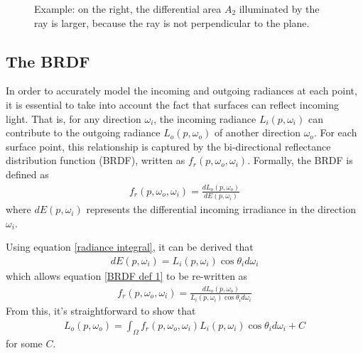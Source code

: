 \begin{figure}[H]
    

\caption{Example: on the right, the differential area $A_2$ illuminated by the ray is larger, because the ray is not perpendicular to the plane.}    
\end{figure}


\subsection{The BRDF}

In order to accurately model the incoming and outgoing radiances at each point, it is essential to take into account the fact that surfaces can reflect incoming light. That is, for any direction $\omega_i$, the incoming radiance $L_i(p,\omega_i)$ can contribute to the outgoing radiance $L_o(p,\omega_o)$ of another direction $\omega_o$. For each surface point, this relationship is captured by the bi-directional reflectance distribution function (BRDF), written as $f_r(p,\omega_o,\omega_i)$. Formally, the BRDF is defined as 
\begin{align}
    f_r(p,\omega_o,\omega_i) = \frac{dL_o(p,\omega_o)}{dE(p,\omega_i)}
    \label{BRDF def 1}
\end{align}
where $dE(p,\omega_i)$ represents the differential incoming irradiance in the direction $\omega_i$.

Using equation \ref{radiance integral}, it can be derived that 
\begin{align}
    dE(p,\omega_i) = L_i(p,\omega_i)\cos\theta_id\omega_i
\end{align}
which allows equation \ref{BRDF def 1} to be re-written as
\begin{align}
    f_r(p,\omega_o,\omega_i) = \frac{dL_o(p,\omega_o)}{L_i(p,\omega_i)\cos\theta_id\omega_i}
\end{align}
From this, it's straightforward to show that
\begin{align}
    L_o(p,\omega_o) = \int_\Omega f_r(p,\omega_o,\omega_i)L_i(p,\omega_i)\cos\theta_id\omega_i + C
    \label{reflection plus C}
\end{align}
for some $C$.

